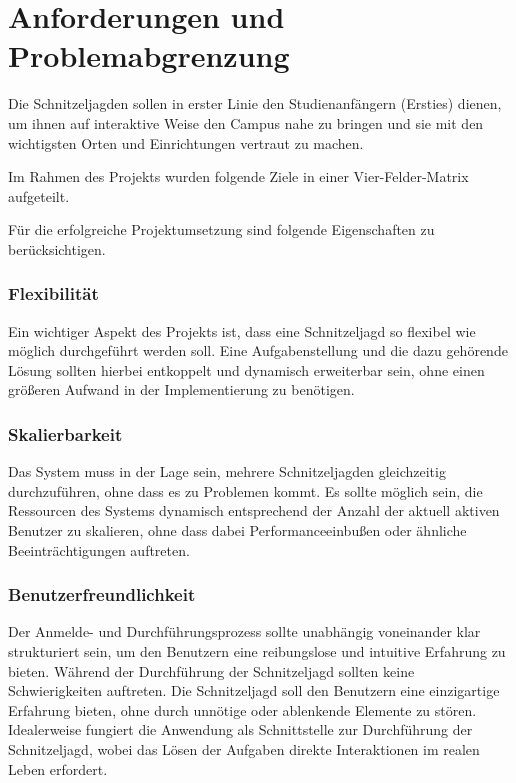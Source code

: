 \section{Anforderungen und Problemabgrenzung}

Die Schnitzeljagden sollen in erster Linie den Studienanfängern (Ersties) dienen, um ihnen auf interaktive Weise den Campus nahe zu bringen und sie mit den wichtigsten Orten und Einrichtungen vertraut zu machen.

Im Rahmen des Projekts wurden folgende Ziele in einer Vier-Felder-Matrix aufgeteilt.


Für die erfolgreiche Projektumsetzung sind folgende Eigenschaften zu berücksichtigen.

\subsubsection{Flexibilität}

Ein wichtiger Aspekt des Projekts ist, dass eine Schnitzeljagd so flexibel wie möglich durchgeführt werden soll. Eine Aufgabenstellung und die dazu gehörende Lösung sollten hierbei entkoppelt und dynamisch erweiterbar sein, ohne einen größeren Aufwand in der Implementierung zu benötigen.

\subsubsection{Skalierbarkeit}

Das System muss in der Lage sein, mehrere Schnitzeljagden gleichzeitig durchzuführen, ohne dass es zu Problemen kommt. Es sollte möglich sein, die Ressourcen des Systems dynamisch entsprechend der Anzahl der aktuell aktiven Benutzer zu skalieren, ohne dass dabei Performanceeinbußen oder ähnliche Beeinträchtigungen auftreten.

\subsubsection{Benutzerfreundlichkeit}

Der Anmelde- und Durchführungsprozess sollte unabhängig voneinander klar strukturiert sein, um den Benutzern eine reibungslose und intuitive Erfahrung zu bieten. Während der Durchführung der Schnitzeljagd sollten keine Schwierigkeiten auftreten. Die Schnitzeljagd soll den Benutzern eine einzigartige Erfahrung bieten, ohne durch unnötige oder ablenkende Elemente zu stören. Idealerweise fungiert die Anwendung als Schnittstelle zur Durchführung der Schnitzeljagd, wobei das Lösen der Aufgaben direkte Interaktionen im realen Leben erfordert.

